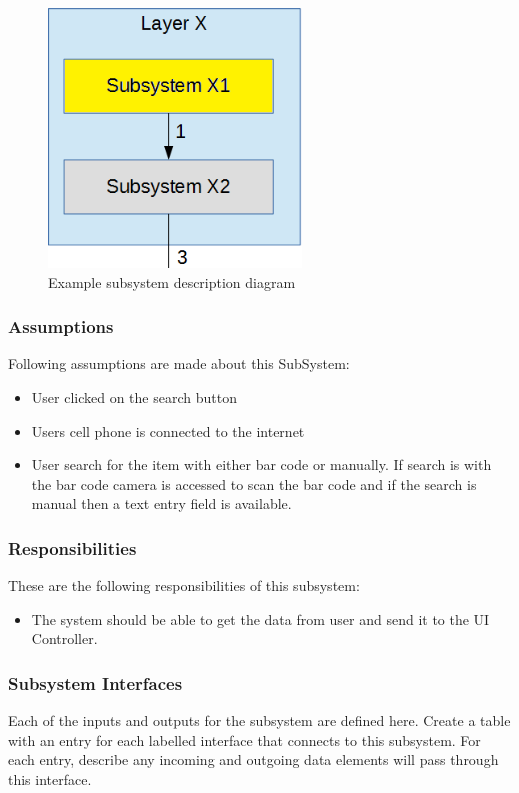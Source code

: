 \begin{figure}[h!]
	\centering
 	\includegraphics[width=0.60\textwidth]{images/subsystem}
 \caption{Example subsystem description diagram}
\end{figure}

\subsubsection{Assumptions}
Following assumptions are made about this SubSystem:
\begin{itemize}
    \item User clicked on the search button
    \item Users cell phone is connected to the internet
    \item User search for the item with either bar code or manually. If search is with the bar code camera is accessed to scan the bar code and if the search is manual then a text entry field is available.
\end{itemize}

\subsubsection{Responsibilities}
These are the following responsibilities of this subsystem:
\begin{itemize}
    \item The system should be able to get the data from user and send it to the UI Controller.
\end{itemize}

\subsubsection{Subsystem Interfaces}
Each of the inputs and outputs for the subsystem are defined here. Create a table with an entry for each labelled interface that connects to this subsystem. For each entry, describe any incoming and outgoing data elements will pass through this interface.

